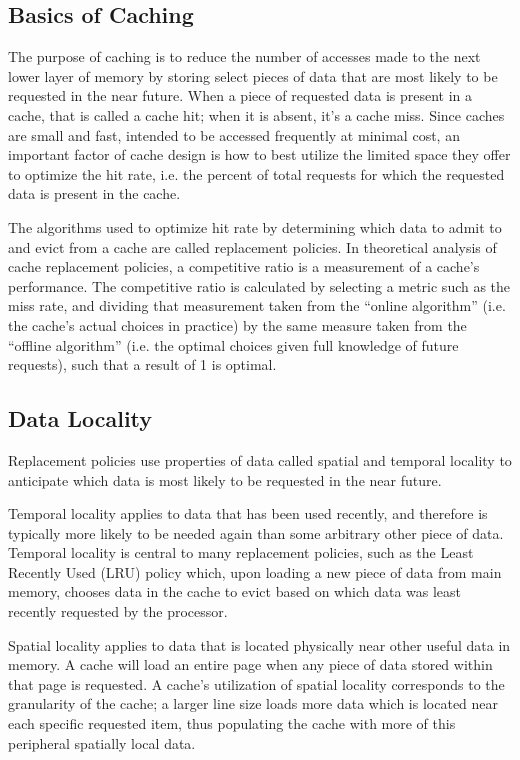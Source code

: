 \documentclass[12pt,twoside]{reedthesis}
\begin{document}
	\subsection*{Basics of Caching}
	
	The purpose of caching is to reduce the number of accesses made to the next lower layer of memory by storing select pieces of data that are most likely to be requested in the near future. When a piece of requested data is present in a cache, that is called a cache hit; when it is absent, it's a cache miss. Since caches are small and fast, intended to be accessed frequently at minimal cost, an important factor of cache design is how to best utilize the limited space they offer to optimize the hit rate, i.e. the percent of total requests for which the requested data is present in the cache.
	
	The algorithms used to optimize hit rate by determining which data to admit to and evict from a cache are called replacement policies. In theoretical analysis of cache replacement policies, a competitive ratio is a measurement of a cache's performance. The competitive ratio is calculated by selecting a metric such as the miss rate, and dividing that measurement taken from the ``online algorithm'' (i.e. the cache's actual choices in practice) by the same measure taken from the ``offline algorithm'' (i.e. the optimal choices given full knowledge of future requests), such that a result of 1 is optimal.

	\subsection*{Data Locality}

	Replacement policies use properties of data called spatial and temporal locality to anticipate which data is most likely to be requested in the near future.
	
	Temporal locality applies to data that has been used recently, and therefore is typically more likely to be needed again than some arbitrary other piece of data. Temporal locality is central to many replacement policies, such as the Least Recently Used (LRU) policy which, upon loading a new piece of data from main memory, chooses data in the cache to evict based on which data was least recently requested by the processor.
	
	Spatial locality applies to data that is located physically near other useful data in memory. A cache will load an entire page when any piece of data stored within that page is requested. A cache's utilization of spatial locality corresponds to the granularity of the cache; a larger line size loads more data which is located near each specific requested item, thus populating the cache with more of this peripheral spatially local data.
\end{document}

